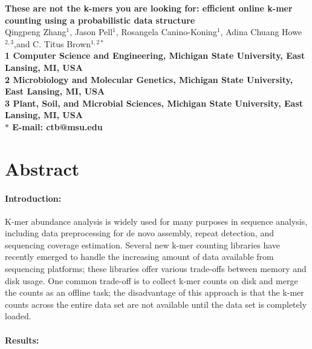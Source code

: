 \documentclass{article}
\begin{document}
\begin{flushleft}
{\Large \textbf{These are not the k-mers you are looking for: efficient
online k-mer counting using a probabilistic data structure}}
\\
Qingpeng Zhang$^{1}$, 
Jason Pell$^{1}$,
Rosangela Canino-Koning$^{1}$,
Adina Chuang Howe$^{2,3}$,and 
C. Titus Brown$^{1,2\ast}$
\\
\bf{1} Computer Science and Engineering, Michigan State University, East Lansing, MI, USA
\\
\bf{2} Microbiology and Molecular Genetics, Michigan State University, East Lansing, MI, USA
\\
\bf{3} Plant, Soil, and Microbial Sciences, Michigan State University, East Lansing, MI, USA
\\
$\ast$ E-mail: ctb@msu.edu
\end{flushleft}

\section{Abstract}

\paragraph{Introduction:}

K-mer abundance analysis is widely used for many purposes in sequence
analysis, including data preprocessing for de novo assembly, repeat
detection, and sequencing coverage estimation.  Several new k-mer
counting libraries have recently emerged to handle the increasing
amount of data available from sequencing platforms; these libraries
offer various trade-offs between memory and disk usage.  One common
trade-off is to collect k-mer counts on disk and merge the counts as
an offline task; the disadvantage of this approach is that the k-mer
counts across the entire data set are not available until the data set
is completely loaded.

\paragraph{Results:}
\end{document}
